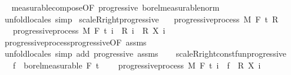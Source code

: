 \begin{isabellebody}
\isadelimproof
\ %
\endisadelimproof
%
\isatagproof
{}\isamarkupfalse%
\ measurable{\isacharunderscore}{\kern0pt}compose{\isacharbrackleft}{\kern0pt}OF\ progressive\ borel{\isacharunderscore}{\kern0pt}measurable{\isacharunderscore}{\kern0pt}norm{\isacharbrackright}{\kern0pt}\ \isamarkupfalse%
\ {\isacharparenleft}{\kern0pt}unfold{\isacharunderscore}{\kern0pt}locales{\isacharparenright}{\kern0pt}\ simp%
\endisatagproof
{\isafoldproof}%
%
\isadelimproof
%
\endisadelimproof
\isanewline
\isanewline
{}\isamarkupfalse%
\ scaleR{\isacharunderscore}{\kern0pt}right{\isacharunderscore}{\kern0pt}progressive{\isacharcolon}{\kern0pt}\isanewline
\ \ \ {\isachardoublequoteopen}progressive{\isacharunderscore}{\kern0pt}process\ M\ F\ t\ R{\isachardoublequoteclose}\isanewline
\ \ \ {\isachardoublequoteopen}progressive{\isacharunderscore}{\kern0pt}process\ M\ F\ t\ {\isacharparenleft}{\kern0pt}{\isasymlambda}i\ {\isasymxi}{\isachardot}{\kern0pt}\ {\isacharparenleft}{\kern0pt}R\ i\ {\isasymxi}{\isacharparenright}{\kern0pt}\ {\isacharasterisk}{\kern0pt}\isactrlsub R\ {\isacharparenleft}{\kern0pt}X\ i\ {\isasymxi}{\isacharparenright}{\kern0pt}{\isacharparenright}{\kern0pt}{\isachardoublequoteclose}\isanewline
%
\isadelimproof
\ \ %
\endisadelimproof
%
\isatagproof
{}\isamarkupfalse%
\ progressive{\isacharunderscore}{\kern0pt}process{\isachardot}{\kern0pt}progressive{\isacharbrackleft}{\kern0pt}OF\ assms{\isacharbrackright}{\kern0pt}\ \isamarkupfalse%
\ {\isacharparenleft}{\kern0pt}unfold{\isacharunderscore}{\kern0pt}locales{\isacharparenright}{\kern0pt}\ {\isacharparenleft}{\kern0pt}simp\ add{\isacharcolon}{\kern0pt}\ progressive\ assms{\isacharparenright}{\kern0pt}%
\endisatagproof
{\isafoldproof}%
%
\isadelimproof
\isanewline
%
\endisadelimproof
\ \ \isanewline
{}\isamarkupfalse%
\ scaleR{\isacharunderscore}{\kern0pt}right{\isacharunderscore}{\kern0pt}const{\isacharunderscore}{\kern0pt}fun{\isacharunderscore}{\kern0pt}progressive{\isacharcolon}{\kern0pt}\ \isanewline
\ \ \ {\isachardoublequoteopen}f\ {\isasymin}\ borel{\isacharunderscore}{\kern0pt}measurable\ {\isacharparenleft}{\kern0pt}F\ t\ \isanewline
\ \ \ {\isachardoublequoteopen}progressive{\isacharunderscore}{\kern0pt}process\ M\ F\ t\ {\isacharparenleft}{\kern0pt}{\isasymlambda}i\ {\isasymxi}{\isachardot}{\kern0pt}\ f\ {\isasymxi}\ {\isacharasterisk}{\kern0pt}\isactrlsub R\ {\isacharparenleft}{\kern0pt}X\ i\ {\isasymxi}{\isacharparenright}{\kern0pt}{\isacharparenright}{\kern0pt}{\isachardoublequoteclose}\isanewline

\end{isabellebody}
